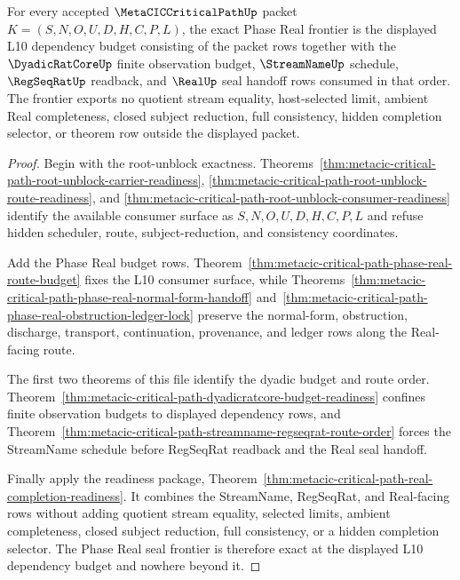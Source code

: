 \begin{theorem}
\label{thm:metacic-critical-path-real-seal-frontier-exactness}
For every accepted $\MetaCICCriticalPathUp$ packet $K=(S,N,O,U,D,H,C,P,L)$, the exact Phase Real frontier is the displayed L10 dependency budget consisting of the packet rows together with the $\DyadicRatCoreUp$ finite observation budget, $\StreamNameUp$ schedule, $\RegSeqRatUp$ readback, and $\RealUp$ seal handoff rows consumed in that order. The frontier exports no quotient stream equality, host-selected limit, ambient Real completeness, closed subject reduction, full consistency, hidden completion selector, or theorem row outside the displayed packet.
\end{theorem}
\begin{proof}
Begin with the root-unblock exactness. Theorems~\ref{thm:metacic-critical-path-root-unblock-carrier-readiness}, \ref{thm:metacic-critical-path-root-unblock-route-readiness}, and \ref{thm:metacic-critical-path-root-unblock-consumer-readiness} identify the available consumer surface as $S,N,O,U,D,H,C,P,L$ and refuse hidden scheduler, route, subject-reduction, and consistency coordinates.

Add the Phase Real budget rows. Theorem~\ref{thm:metacic-critical-path-phase-real-route-budget} fixes the L10 consumer surface, while Theorems~\ref{thm:metacic-critical-path-phase-real-normal-form-handoff} and~\ref{thm:metacic-critical-path-phase-real-obstruction-ledger-lock} preserve the normal-form, obstruction, discharge, transport, continuation, provenance, and ledger rows along the Real-facing route.

The first two theorems of this file identify the dyadic budget and route order. Theorem~\ref{thm:metacic-critical-path-dyadicratcore-budget-readiness} confines finite observation budgets to displayed dependency rows, and Theorem~\ref{thm:metacic-critical-path-streamname-regseqrat-route-order} forces the StreamName schedule before RegSeqRat readback and the Real seal handoff.

Finally apply the readiness package, Theorem~\ref{thm:metacic-critical-path-real-completion-readiness}. It combines the StreamName, RegSeqRat, and Real-facing rows without adding quotient stream equality, selected limits, ambient completeness, closed subject reduction, full consistency, or a hidden completion selector. The Phase Real seal frontier is therefore exact at the displayed L10 dependency budget and nowhere beyond it.
\end{proof}


